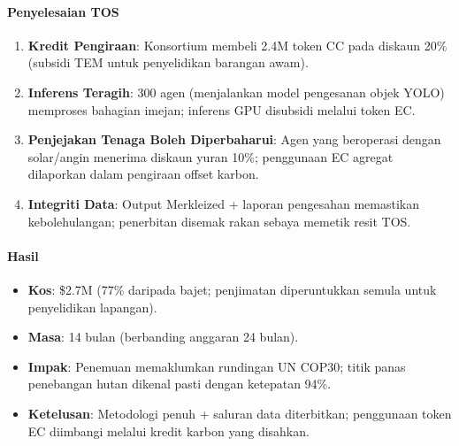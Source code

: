 \documentclass[11pt]{article}
\begin{document}
\paragraph{Penyelesaian TOS}
\begin{enumerate}[noitemsep]
  \item \textbf{Kredit Pengiraan}: Konsortium membeli 2.4M token CC pada diskaun 20\% (subsidi TEM untuk penyelidikan barangan awam).
  \item \textbf{Inferens Teragih}: 300 agen (menjalankan model pengesanan objek YOLO) memproses bahagian imejan; inferens GPU disubsidi melalui token EC.
  \item \textbf{Penjejakan Tenaga Boleh Diperbaharui}: Agen yang beroperasi dengan solar/angin menerima diskaun yuran 10\%; penggunaan EC agregat dilaporkan dalam pengiraan offset karbon.
  \item \textbf{Integriti Data}: Output Merkleized + laporan pengesahan memastikan kebolehulangan; penerbitan disemak rakan sebaya memetik resit TOS.
\end{enumerate}

\paragraph{Hasil}
\begin{itemize}[noitemsep]
  \item \textbf{Kos}: \$2.7M (77\% daripada bajet; penjimatan diperuntukkan semula untuk penyelidikan lapangan).
  \item \textbf{Masa}: 14 bulan (berbanding anggaran 24 bulan).
  \item \textbf{Impak}: Penemuan memaklumkan rundingan UN COP30; titik panas penebangan hutan dikenal pasti dengan ketepatan 94\%.
  \item \textbf{Ketelusan}: Metodologi penuh + saluran data diterbitkan; penggunaan token EC diimbangi melalui kredit karbon yang disahkan.
\end{itemize}
\end{document}
